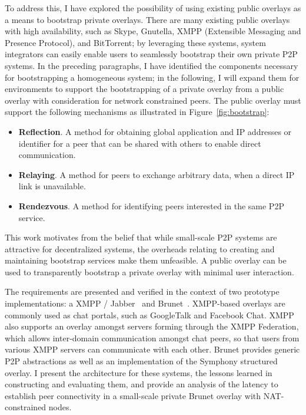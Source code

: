 To address this, I have explored the possibility of using existing public
overlays as a means to bootstrap private overlays.  There are many existing
public overlays with high availability, such as Skype, Gnutella, XMPP
(Extensible Messaging and Presence Protocol), and BitTorrent; by leveraging
these systems, system integrators can easily enable users to seamlessly
bootstrap their own private P2P systems.  In the preceding paragraphs, I have
identified the components necessary for bootstrapping a homogeneous system; in
the following, I will expand them for environments to support the bootstrapping
of a private overlay from a public overlay with consideration for network
constrained peers.  The public overlay must support the following mechanisms as
illustrated in Figure~\ref{fig:bootstrap}:

\begin{itemize}

\item {\bf Reflection}. A method for obtaining global application and IP
addresses or identifier for a peer that can be shared with others to enable
direct communication.

\item {\bf Relaying}. A method for peers to exchange arbitrary data, when a
direct IP link is unavailable.

\item {\bf Rendezvous}. A method for identifying peers interested in the same
P2P service.

\end{itemize}

This work motivates from the belief that while small-scale P2P systems are
attractive for decentralized systems, the overheads relating to creating and
maintaining bootstrap services make them unfeasible.  A public overlay can be
used to transparently bootstrap a private overlay with minimal user
interaction.

The requirements are presented and verified in the context of two prototype
implementations: a XMPP / Jabber~\cite{xmpp} and Brunet~\cite{brunet}.
XMPP-based overlays are commonly used as chat portals, such as GoogleTalk and
Facebook Chat.  XMPP also supports an overlay amongst servers forming through
the XMPP Federation, which allows inter-domain communication amongst chat
peers, so that users from various XMPP servers can communicate with each other.
Brunet provides generic P2P abstractions as well as an implementation of the
Symphony structured overlay.  I present the architecture for these systems, the
lessons learned in constructing and evaluating them, and provide an analysis of
the latency to establish peer connectivity in a small-scale private Brunet
overlay with NAT-constrained nodes.

